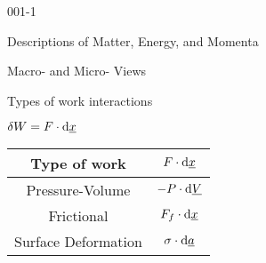 \begin{mitframe}{001-1} %

{	\centering
\begin{listone}
    
    \item Descriptions of Matter, Energy, and Momenta
    
    \item Macro- and Micro- Views
    
\end{listone}

        
Types of work interactions
                
$\delta\work = \force \cdot \mathrm{d}\gendisp$
        
\bigskip
        
        
        
                
\begin{tabular}{ | c | c |  }
        
	\hline
            
	Type of work & $\force \cdot \mathrm{d}\gendisp$ \\
            
	\hline
            
	Pressure-Volume & $-\p \cdot \mathrm{d}\uline{\vol}$ \\
            
	\hline
            
	Frictional & $\fricforce \cdot \mathrm{d}\gendisp$ \\
            
	\hline
            
	Surface Deformation & $\surftens \cdot \mathrm{d}\totalsa$ \\
            

\end{tabular}}
\end{mitframe}
